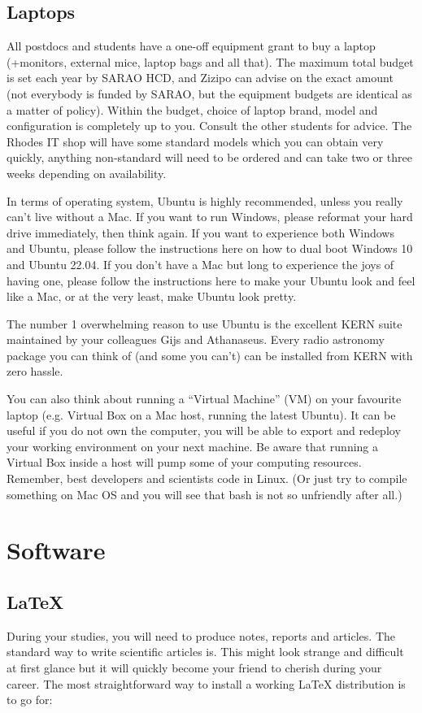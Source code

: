 \subsection{Laptops}
All postdocs and students have a one-off equipment grant to buy a laptop (+monitors, external mice, laptop bags and all that). The maximum total budget is set each year by SARAO HCD, and Zizipo can advise on the exact amount (not everybody is funded by SARAO, but the equipment budgets are identical as a matter of policy). 
Within the budget, choice of laptop brand, model and configuration is completely up to you. Consult the other students for advice. The Rhodes IT shop will have some standard models which you can obtain very quickly, anything non-standard will need to be ordered and can take two or three weeks depending on availability.

In terms of operating system, Ubuntu is highly recommended, unless you really can’t live without a Mac. If you want to run Windows, please reformat your hard drive immediately, then think again. If you want to experience both Windows and Ubuntu, please follow the instructions here on how to dual boot Windows 10 and Ubuntu 22.04. If you don’t have a Mac but long to experience the joys of having one, please follow the instructions here to make your Ubuntu look and feel like a Mac, or at the very least, make Ubuntu look pretty. 

The number 1 overwhelming reason to use Ubuntu is the excellent KERN suite maintained by your colleagues Gijs and Athanaseus. Every radio astronomy package you can think of (and some you can’t) can be installed from KERN with zero hassle. 

You can also think about running a “Virtual Machine” (VM) on your favourite laptop (e.g. Virtual Box on a Mac host,  running the latest Ubuntu).  It can be useful if you do not own the computer, you will be able to export and redeploy your working environment on your next machine. Be aware that running a Virtual Box inside a host will pump some of your computing resources. Remember, best developers and scientists code in Linux. (Or just try to compile something on Mac OS and you will see that bash is not so unfriendly after all.)



\section{Software}

\subsection{LaTeX }
During your studies, you will need to produce notes, reports and articles. The standard way to write scientific articles is. This might look strange and difficult at first glance but it will quickly become your friend to cherish during your career.
The most straightforward way to install a working LaTeX distribution is to go for:

